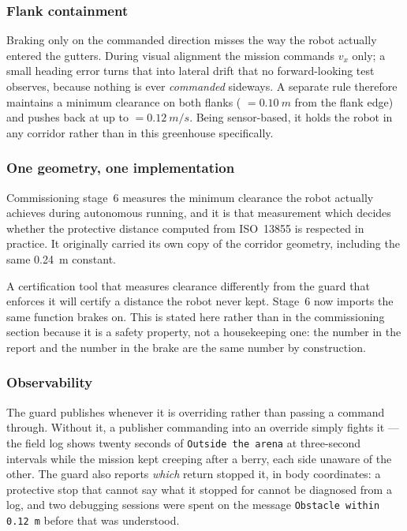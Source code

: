 \subsubsection{Flank containment}

Braking only on the commanded direction misses the way the robot actually
entered the gutters. During visual alignment the mission commands $v_x$
only; a small heading error turns that into lateral drift that no
forward-looking test observes, because nothing is ever \emph{commanded}
sideways. A separate rule therefore maintains a minimum clearance on both
flanks ( $= \SI{0.10}{m}$ from the flank edge) and pushes
back at up to  $= \SI{0.12}{m/s}$. Being sensor-based, it
holds the robot in any corridor rather than in this greenhouse specifically.

\subsubsection{One geometry, one implementation}

Commissioning stage~6 measures the minimum clearance the robot actually
achieves during autonomous running, and it is that measurement which decides
whether the protective distance computed from ISO~13855 is respected in
practice. It originally carried its own copy of the corridor geometry,
including the same \SI{0.24}{m} constant.

A certification tool that measures clearance differently from the guard that
enforces it will certify a distance the robot never kept. Stage~6 now imports
the same function  brakes on. This is stated here
rather than in the commissioning section because it is a safety property, not
a housekeeping one: the number in the report and the number in the brake are
the same number by construction.

\subsubsection{Observability}

The guard publishes  whenever it is overriding
rather than passing a command through. Without it, a publisher commanding
into an override simply fights it --- the field log shows twenty seconds of
\texttt{Outside the arena} at three-second intervals while the mission kept
creeping after a berry, each side unaware of the other. The guard also
reports \emph{which} return stopped it, in body coordinates: a protective
stop that cannot say what it stopped for cannot be diagnosed from a log, and
two debugging sessions were spent on the message \texttt{Obstacle within
0.12 m} before that was understood.

